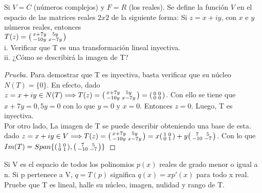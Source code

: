 \documentclass[12pt]{article}
\newenvironment{problem}[2][Problem]{\begin{trivlist}
\item[\hskip \labelsep {\bfseries #1}\hskip \labelsep {\bfseries #2.}]}{\end{trivlist}}
\newenvironment{xmat}
  {\left(\begin{smallmatrix}}
  {\end{smallmatrix}\right)}
\begin{document}
\begin{problem}{2.3}
Si $V=C$ (números complejos) y $F= R$ (los reales). Se define la función $V$ en el espacio de las matrices reales $2x2$ de la siguiente forma: Si $z= x + iy$, con $x$ e $y$ números reales, entonces \\
$T(z)=\begin{xmat}x+7y & 5y\\-10y & x-7y\end{xmat}$\\
i. Verificar que T es una transformación lineal inyectiva.\\
ii. ¿Cómo se describirá la imagen de T?
\end{problem}

\begin{proof}[Prueba]
Para demostrar que T es inyectiva, basta verificar que su núcleo $N(T)=\{0\}$. En efecto, dado $z=x+iy \in N(T) \Longrightarrow T(z)=\begin{xmat}x+7y & 5y\\-10y & x-7y\end{xmat}=\begin{xmat}0 & 0\\0 & 0\end{xmat}$. Con ello se tiene que $x+7y=0, 5y=0$ con lo que $y=0$ y $x=0$. Entonces $z=0$. Luego, T es inyectiva.\\
Por otro lado, La imagen de T se puede describir obteniendo una base de esta. dado $z=x+iy \in V \Longrightarrow T(z)=\begin{xmat}x+7y & 5y\\-10y & x-7y\end{xmat}=
x\begin{xmat}1 & 0\\0 & 1\end{xmat} + 
y\begin{xmat}7 & 5\\-10 & -7\end{xmat}$. Con lo que $Im(T)=Span\{\begin{xmat}1 & 0\\0 & 1\end{xmat}, \begin{xmat}7 & 5\\-10 & -7\end{xmat}\}$
\end{proof}

\begin{problem}{2.4}
Si V es el espacio de todos los polinomios $p(x)$ reales de grado menor o igual a n. Si p pertenece a V,  $q=T(p)$ significa $q(x)=xp'(x)$ para todo x real. Pruebe que T es lineal, halle su núcleo, imagen, nulidad y rango de T.
\end{problem}
\end{document}
